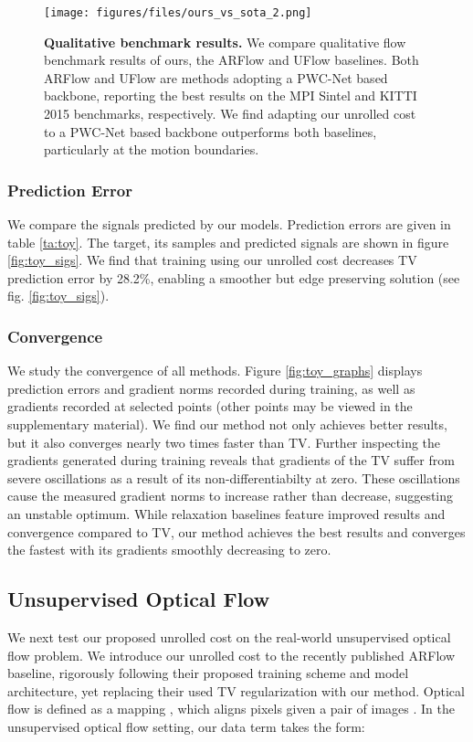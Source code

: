 \documentclass[10pt,twocolumn,letterpaper]{article}
\begin{document}
\begin{figure*}
\begin{center}
\texttt{[image: figures/files/ours\_vs\_sota\_2.png]}
   \caption{\textbf{Qualitative benchmark results.}
   We compare qualitative flow benchmark results of ours, the ARFlow \cite{liu2020learning} and UFlow \cite{jonschkowski2020matters} baselines. Both ARFlow and UFlow are methods adopting a PWC-Net \cite{Sun2018PWC-Net} based backbone, reporting the best results on the MPI Sintel \cite{Butler:ECCV:2012} and KITTI 2015 \cite{Menze2015CVPR} benchmarks, respectively. 
   We find adapting our unrolled cost to a PWC-Net based backbone outperforms both baselines, particularly at the motion boundaries.}
\label{fig:l1vsunroll}
\end{center}
\end{figure*} 
\subsubsection{Prediction Error}
We compare the signals predicted by our models. Prediction errors are given in table \ref{ta:toy}.
The target, its samples and predicted signals are shown in figure \ref{fig:toy_sigs}. We find that training using our unrolled cost decreases TV prediction error by 28.2\%, enabling a smoother but edge preserving solution (see fig. \ref{fig:toy_sigs}).

\subsubsection{Convergence}
We study the convergence of all methods. Figure \ref{fig:toy_graphs} displays prediction errors and gradient norms recorded during training, as well as gradients recorded at selected points (other points may be viewed in the supplementary material). We find our method not only achieves better results, but it also converges nearly two times faster than TV. Further inspecting the gradients generated during training reveals that gradients of the TV suffer from severe oscillations as a result of its non-differentiabilty at zero. These oscillations cause the measured gradient norms to increase rather than decrease, suggesting an unstable optimum. While  relaxation baselines feature improved results and convergence compared to TV, our method achieves the best results and converges the fastest with its gradients smoothly decreasing to zero.

\subsection{Unsupervised Optical Flow} \label{sec:of}
We next test our proposed unrolled cost on the real-world unsupervised optical flow problem. We introduce our unrolled cost to the recently published ARFlow \cite{liu2020learning} baseline, rigorously following their proposed training scheme and model architecture, yet replacing their used TV regularization with our method. Optical flow is defined as a mapping , which aligns pixels given a pair of images . In the unsupervised optical flow setting, our data term takes the form:
\end{document}
